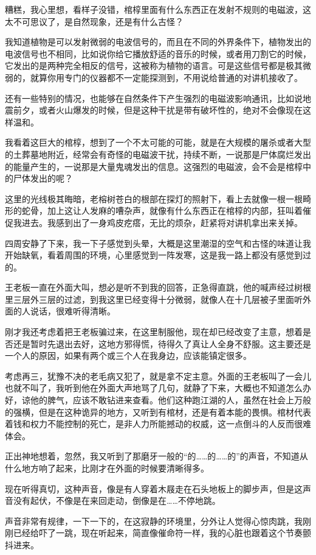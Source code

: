 糟糕，我心里想，看样子没错，棺椁里面有什么东西正在发射不规则的电磁波，这太不可思议了，是自然现象，还是有什么古怪？

我知道植物是可以发射微弱的电波信号的，而且在不同的外界条件下，植物发出的电波信号也不相同，比如说你给它播放舒适的音乐的时候，或者用刀割它的时候，它发出的是两种完全相反的信号，这被称为植物的语言。可是这些信号都是极其微弱的，就算你用专门的仪器都不一定能探测到，不用说给普通的对讲机接收了。

还有一些特别的情况，也能够在自然条件下产生强烈的电磁波影响通讯，比如说地震前夕，或者火山爆发的时候，但是这种干扰是带有破坏性的，绝对不会像现在这样温和。

我看着这巨大的棺椁，想到了一个不太可能的可能，就是在大规模的屠杀或者大型的土葬墓地附近，经常会有奇怪的电磁波干扰，持续不断，一说那是尸体腐烂发出的能量产生的，一说那是大量鬼魂发出的信息。这强烈的电磁波，会不会是棺椁中的尸体发出的呢？

这里的光线极其晦暗，老榕树苍白的根部在探灯的照射下，看上去就像一根一根畸形的蛇骨，加上这让人发麻的嘈杂声，就像有什么东西正在棺椁的内部，狂叫着催促我进去。我感到出了一身鸡皮疙瘩，无比的烦杂，赶紧将对讲机拿出来关掉。

四周安静了下来，我一下子感觉到头晕，大概是这里潮湿的空气和古怪的味道让我开始缺氧，看着周围的环境，心里感觉到一阵发寒，这是我一路上都没有感觉到过的。

王老板一直在外面大叫，想必是听不到我的回答，正急得直跳，他的喊声经过树根里三层外三层的过滤，到我这里已经变得十分微弱，就像人在十几层被子里面听外面的人说话，很难听得清晰。

刚才我还考虑着把王老板骗过来，在这里制服他，现在却已经改变了主意，想着是否还是暂时先退出去好，这地方邪得慌，待得久了真让人全身不舒服。这主要还是一个人的原因，如果有两个或三个人在我身边，应该能镇定很多。

考虑再三，犹豫不决的老毛病又犯了，就是拿不定主意。外面的王老板叫了一会儿也就不叫了，我听到他在外面大声地骂了几句，就静了下来，大概也不知道怎么办好，谅他的脾气，应该不敢钻进来查看。他们这种跑江湖的人，虽然在社会上万般的强横，但是在这种诡异的地方，又听到有棺材，还是有着本能的畏惧。棺材代表着钱和权力不能控制的死亡，是非人力所能撼动的权威，这一点倒斗的人反而很难体会。

正出神地想着，忽然，我又听到了那磨牙一般的“的……的……的”的声音，不知道从什么地方响了起来，比刚才在外面的时候要清晰得多。

现在听得真切，这种声音，像是有人穿着木屐走在石头地板上的脚步声，但是这声音没有起伏，不像是在来回走动，倒像是在……不停地跳。

声音非常有规律，一下一下的，在这寂静的环境里，分外让人觉得心惊肉跳，我刚刚已经给吓了一跳，现在听起来，简直像催命符一样，我的心脏也跟着这个节奏颤抖进来。

